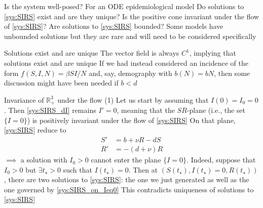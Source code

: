 \documentclass[aspectratio=43]{beamer}
\begin{document}
\begin{frame}{Is the system well-posed?} 
For an ODE epidemiological model
\vfill
\bbullet Do solutions to \eqref{sys:SIRS} exist and are they unique?
\vfill
\bbullet Is the positive cone invariant under the flow of \eqref{sys:SIRS}?
\vfill
\bbullet Are solutions to \eqref{sys:SIRS} bounded?
Some models have unbounded solutions but they are rare and will need to be considered specifically
\end{frame}

\begin{frame}{Solutions exist and are unique}
\bbullet The vector field is always $C^1$, implying that solutions exist and are unique
\vfill
If we had instead considered an incidence of the form $f(S,I,N)=\beta SI/N$ and, say, demography with $b(N)=bN$, then some discussion might have been needed if $b<d$
\end{frame}


\begin{frame}{Invariance of $\mathbb{R}_+^3$ under the flow (1)}
Let us start by assuming that $I(0)=I_0=0$. Then \eqref{sys:SIRS_dI} remains $I'=0$, meaning that the $SR$-plane (i.e., the set $\{I=0\}$) is positively invariant under the flow of \eqref{sys:SIRS}
\vfill
On that plane, \eqref{sys:SIRS} reduce to
\begin{subequations}\label{sys:SIRS_on_Ieq0}
\begin{align}
S' &= b+\nu R-dS \\
R' &= -(d+\nu)R
\end{align}    
\end{subequations}
\vfill
$\implies$ a solution with $I_0>0$ cannot enter the plane $\{I=0\}$. Indeed, suppose that $I_0>0$ but $\exists t_\star>0$ such that $I(t_\star)=0$. Then at $(S(t_\star),I(t_\star)=0,R(t_\star))$, there are two solutions to \eqref{sys:SIRS}: the one we just generated as well as the one governed by \eqref{sys:SIRS_on_Ieq0}
\vfill
This contradicts uniqueness of solutions to \eqref{sys:SIRS}
\end{frame}
\end{document}
